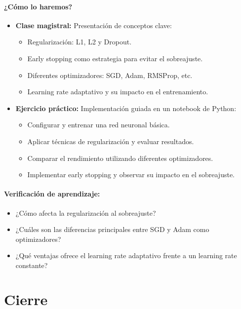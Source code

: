 \documentclass[a4,11pt]{aleph-notas}
\begin{document}
\paragraph{¿Cómo lo haremos?}  
\begin{itemize}[leftmargin=*]  
    \item \textbf{Clase magistral:}  
    Presentación de conceptos clave:
    \begin{itemize}[leftmargin=*]
        \item Regularización: L1, L2 y Dropout.
        \item Early stopping como estrategia para evitar el sobreajuste.
        \item Diferentes optimizadores: SGD, Adam, RMSProp, etc.
        \item Learning rate adaptativo y su impacto en el entrenamiento.
    \end{itemize}  
    \item \textbf{Ejercicio práctico:}  
    Implementación guiada en un notebook de Python:
    \begin{itemize}[leftmargin=*]
        \item Configurar y entrenar una red neuronal básica.
        \item Aplicar técnicas de regularización y evaluar resultados.
        \item Comparar el rendimiento utilizando diferentes  optimizadores.
        \item Implementar early stopping y observar su impacto en el sobreajuste.
    \end{itemize}  
\end{itemize}  

\paragraph{Verificación de aprendizaje:}  
\begin{itemize}[leftmargin=*]  
    \item ¿Cómo afecta la regularización al sobreajuste?  
    \item ¿Cuáles son las diferencias principales entre SGD y Adam como optimizadores?  
    \item ¿Qué ventajas ofrece el learning rate adaptativo frente a un learning rate constante?  
\end{itemize}  

\section*{Cierre}  
\end{document}
